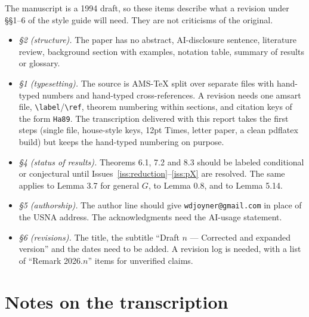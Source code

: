 \documentclass[12pt,letterpaper]{article}
\theoremstyle{definition}
\begin{document}
The manuscript is a 1994 draft, so these items describe what a revision under
\S\S1--6 of the style guide will need. They are not criticisms of the
original.
\begin{itemize}
\item \emph{\S2 (structure).} The paper has no abstract, AI-disclosure
sentence, literature review, background section with examples, notation
table, summary of results or glossary.
\item \emph{\S1 (typesetting).} The source is AMS-TeX split over separate
files with hand-typed numbers and hand-typed cross-references. A revision needs
one amsart file, \verb|\label|/\verb|\ref|, theorem numbering within sections,
and citation keys of the form \texttt{Ha89}. The transcription delivered with
this report takes the first steps (single file, house-style keys, 12pt Times,
letter paper, a clean pdflatex build) but keeps the hand-typed numbering on
purpose.
\item \emph{\S4 (status of results).} Theorems 6.1, 7.2 and 8.3 should be
labeled conditional or conjectural until Issues~\ref{iss:reduction}--\ref{iss:pX}
are resolved. The same applies to Lemma 3.7 for general $G$, to Lemma 0.8, and
to Lemma 5.14.
\item \emph{\S5 (authorship).} The author line should give
\texttt{wdjoyner@gmail.com} in place of the USNA address. The acknowledgments
need the AI-usage statement.
\item \emph{\S6 (revisions).} The title, the subtitle ``Draft $n$ --- Corrected
and expanded version'' and the dates need to be added. A revision log is
needed, with a list of ``Remark 2026.$n$'' items for unverified claims.
\end{itemize}

\section{Notes on the transcription}
\end{document}
